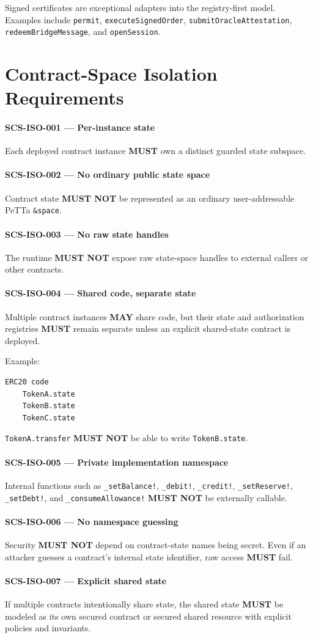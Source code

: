 \documentclass[11pt]{article}
\newcommand{\PeTTa}{PeTTa}
\newcommand{\MUST}{\textbf{MUST}}
\newcommand{\MUSTNOT}{\textbf{MUST NOT}}
\newcommand{\MAY}{\textbf{MAY}}
\newcommand{\req}[2]{\paragraph{#1}#2\par}
\newcommand{\code}[1]{\texttt{#1}}
\begin{document}
Signed certificates are exceptional adapters into the registry-first model. Examples include \code{permit}, \code{executeSignedOrder}, \code{submitOracleAttestation}, \code{redeemBridgeMessage}, and \code{openSession}.



\section{Contract-Space Isolation Requirements}

\req{SCS-ISO-001 --- Per-instance state}{Each deployed contract instance \MUST{} own a distinct guarded state subspace.}

\req{SCS-ISO-002 --- No ordinary public state space}{Contract state \MUSTNOT{} be represented as an ordinary user-addressable \PeTTa{} \code{\&space}.}

\req{SCS-ISO-003 --- No raw state handles}{The runtime \MUSTNOT{} expose raw state-space handles to external callers or other contracts.}

\req{SCS-ISO-004 --- Shared code, separate state}{Multiple contract instances \MAY{} share code, but their state and authorization registries \MUST{} remain separate unless an explicit shared-state contract is deployed.}

Example:

\begin{lstlisting}
ERC20 code
    TokenA.state
    TokenB.state
    TokenC.state
\end{lstlisting}

\code{TokenA.transfer} \MUSTNOT{} be able to write \code{TokenB.state}.

\req{SCS-ISO-005 --- Private implementation namespace}{Internal functions such as \code{\_setBalance!}, \code{\_debit!}, \code{\_credit!}, \code{\_setReserve!}, \code{\_setDebt!}, and \code{\_consumeAllowance!} \MUSTNOT{} be externally callable.}

\req{SCS-ISO-006 --- No namespace guessing}{Security \MUSTNOT{} depend on contract-state names being secret. Even if an attacker guesses a contract's internal state identifier, raw access \MUST{} fail.}

\req{SCS-ISO-007 --- Explicit shared state}{If multiple contracts intentionally share state, the shared state \MUST{} be modeled as its own secured contract or secured shared resource with explicit policies and invariants.}
\end{document}
